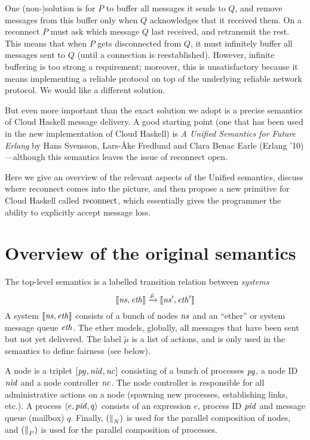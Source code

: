 \documentclass[10pt]{article}
\begin{document}
One (non-)solution is for $P$ to buffer all messages it sends to $Q$, and
remove messages from this buffer only when $Q$ acknowledges that it received
them. On a reconnect $P$ must ask which message $Q$ last received, and
retransmit the rest. This means that when $P$ gets disconnected from $Q$, it
must infinitely buffer all messages sent to $Q$ (until a connection is
reestablished). However, infinite buffering is too strong a requirement;
moreover, this is unsatisfactory because it means implementing a reliable
protocol on top of the underlying reliable network protocol. We would like a
different solution.

But even more important than the exact solution we adopt is a precise
semantics of Cloud Haskell message delivery. A good starting point (one that
has been used in the new implementation of Cloud Haskell) is \textit{A
Unified Semantics for Future Erlang} by Hans Svensson, Lars-\AA{}ke Fredlund
and Clara Benac Earle (Erlang '10)---although this semantics leaves the issue
of reconnect open.

Here we give an overview of the relevant aspects of the Unified semantics,
discuss where reconnect comes into the picture, and then propose a new
primitive for Cloud Haskell called $\mathrm{reconnect}$, which essentially gives the
programmer the ability to explicitly accept message loss.

\section*{Overview of the original semantics}

The top-level semantics is a labelled transition relation between
\textit{systems}
%
\begin{equation}
\llbracket \mathit{ns}, \mathit{eth} \rrbracket \xrightarrow{\tilde{\mu}} \llbracket \mathit{ns}', \mathit{eth}' \rrbracket
\end{equation}
%
A system $\llbracket \mathit{ns}, \mathit{eth} \rrbracket$ consists of a bunch of nodes $\mathit{ns}$
and an ``ether'' or system message queue $\mathit{eth}$. The ether models, globally,
all messages that have been sent but not yet delivered. The label $\tilde{\mu}$
is a list of actions, and is only used in the semantics to define fairness (see
below). 

A node is a triplet $[ \mathit{pg}_{}, \mathit{nid}_{}, \mathit{nc}_{} ]$ consisting of a bunch of processes
$\mathit{pg}$, a node ID $\mathit{nid}$ and a node controller $\mathit{nc}$. The node
controller is responsible for all administrative actions on a node (spawning
new processes, establishing links, etc.). 
A process $\langle e, \mathit{pid}, q \rangle$ consists of an expression $e$, process ID $\mathit{pid}$
and message queue (mailbox) $q$. Finally, $(\mathrel{{\parallel}_N})$ is used for the parallel
composition of nodes, and $(\mathrel{{\parallel}_P})$ is used for the parallel composition of
processes. 
\end{document}
